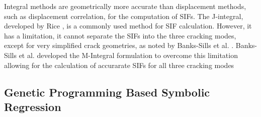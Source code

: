 Integral methods are geometrically more accurate than displacement methods, such as displacement correlation, for the computation of SIFs. The J-integral, developed by Rice \cite{Rice1968}, is a commonly used method for SIF calculation. However, it has a limitation, it cannot separate the SIFs into the three cracking modes, except for very simplified crack geometries, as noted by Banks-Sills et al. \cite{Banks-Sills2005}. Banks-Sills et al. developed the M-Integral formulation to overcome this limitation allowing for the calculation of accurarate SIFs for all three cracking modes \cite{Banks-Sills2005}

\subsection{Genetic Programming Based Symbolic Regression}

